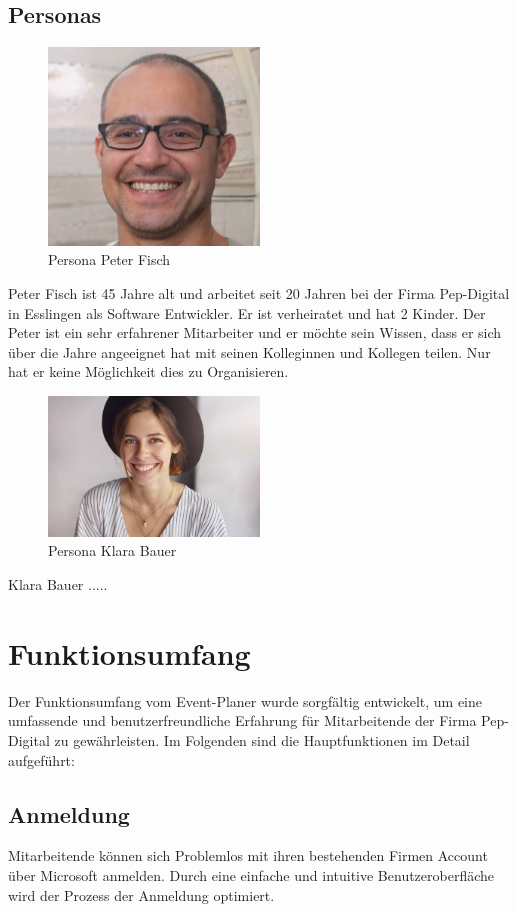 \documentclass[a4paper,12pt]{article}
\begin{document}
\subsection{Personas}
\begin{figure}[h]
  \centering
  \includegraphics[width=0.5\textwidth]{Abbildungen/Persona_1.png}
  \caption{Persona Peter Fisch}
  \label{fig:persona_1}
\end{figure} 
Peter Fisch ist 45 Jahre alt und arbeitet seit 20 Jahren bei der Firma Pep-Digital in Esslingen als Software Entwickler. Er ist verheiratet und hat 2 Kinder. Der Peter ist ein sehr erfahrener Mitarbeiter und er möchte sein Wissen, dass er sich über die Jahre angeeignet hat mit seinen Kolleginnen und Kollegen teilen. Nur hat er keine Möglichkeit dies zu Organisieren.
\newpage
\begin{figure}[h]
  \centering
  \includegraphics[width=0.5\textwidth]{Abbildungen/Persona_2.png}
  \caption{Persona Klara Bauer}
  \label{fig:persona_2}
\end{figure}
Klara Bauer .....
\newpage
\section{Funktionsumfang}
Der Funktionsumfang vom Event-Planer wurde sorgfältig entwickelt, um eine umfassende und benutzerfreundliche Erfahrung für Mitarbeitende der Firma Pep-Digital zu gewährleisten. Im Folgenden sind die Hauptfunktionen im Detail aufgeführt:
\subsection{Anmeldung}
Mitarbeitende können sich Problemlos mit ihren bestehenden Firmen Account über Microsoft anmelden. Durch eine einfache und intuitive Benutzeroberfläche wird der Prozess der Anmeldung optimiert.
\end{document}
